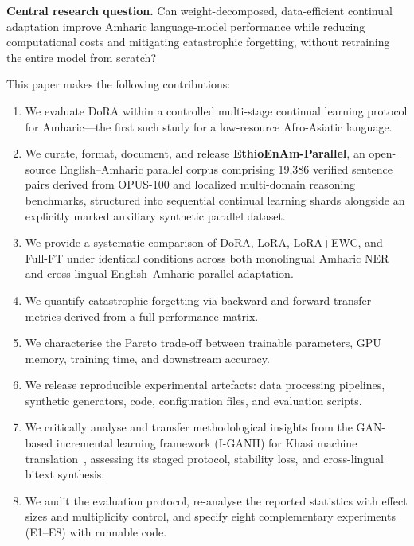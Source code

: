 \documentclass[11pt,a4paper]{article}
\begin{document}
\textbf{Central research question.}  Can weight-decomposed,
data-efficient continual adaptation improve Amharic language-model
performance while reducing computational costs and mitigating
catastrophic forgetting, without retraining the entire model from
scratch?

This paper makes the following contributions:
\begin{enumerate}
  \item We evaluate DoRA within a controlled multi-stage continual
        learning protocol for Amharic---the first such study for a
        low-resource Afro-Asiatic language.
  \item We curate, format, document, and release \textbf{EthioEnAm-Parallel},
        an open-source English--Amharic parallel corpus comprising
        19,386 verified sentence pairs derived from OPUS-100 and
        localized multi-domain reasoning benchmarks, structured into
        sequential continual learning shards alongside an explicitly
        marked auxiliary synthetic parallel dataset.
  \item We provide a systematic comparison of DoRA, LoRA, LoRA+EWC,
        and Full-FT under identical conditions across both monolingual
        Amharic NER and cross-lingual English--Amharic parallel adaptation.
  \item We quantify catastrophic forgetting via backward and forward
        transfer metrics derived from a full performance matrix.
  \item We characterise the Pareto trade-off between trainable
        parameters, GPU memory, training time, and downstream accuracy.
  \item We release reproducible experimental artefacts: data processing
        pipelines, synthetic generators, code, configuration files, and
        evaluation scripts.
  \item We critically analyse and transfer methodological insights
        from the GAN-based incremental learning framework (I-GANH)
        for Khasi machine translation~\cite{Syiemlieh2026}, assessing its
        staged protocol, stability loss, and cross-lingual bitext synthesis.
  \item We audit the evaluation protocol, re-analyse the reported
        statistics with effect sizes and multiplicity control, and
        specify eight complementary experiments (E1--E8) with
        runnable code.
\end{enumerate}

\end{document}

